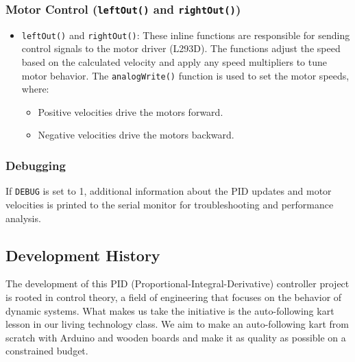 \documentclass[a4paper,12pt]{article}
\begin{document}
\begin{lstlising}[language=C++]
\subsubsection{Motor Control (\texttt{leftOut()} and \texttt{rightOut()})}
\begin{itemize}
\item \texttt{leftOut()} and \texttt{rightOut()}: These inline functions are responsible for sending control signals to the motor driver (L293D). The functions adjust the speed based on the calculated velocity and apply any speed multipliers to tune motor behavior. The \texttt{analogWrite()} function is used to set the motor speeds, where:
\begin{itemize}
\item Positive velocities drive the motors forward.
\item Negative velocities drive the motors backward.
\end{itemize}
\end{itemize}
\subsubsection{Debugging}
If \texttt{DEBUG} is set to 1, additional information about the PID updates and motor velocities is printed to the serial monitor for troubleshooting and performance analysis.
\subsection{Development History}
The development of this PID (Proportional-Integral-Derivative) controller project is rooted in control theory, a field of engineering that focuses on the behavior of dynamic systems. What makes us take the initiative is the auto-following kart lesson in our living technology class. We aim to make an auto-following kart from scratch with Arduino and wooden boards and make it as quality as possible on a constrained budget.

\end{lstlising}
\end{document}
